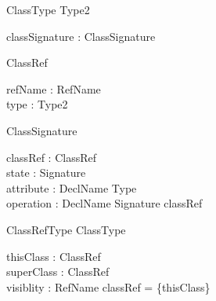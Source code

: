 \begin{sidebyside}
\begin{class}{ClassType}
  Type2\\
\begin{state}
  classSignature : ClassSignature
\end{state}
\end{class}
\nextside
\begin{class}{ClassRef}
\begin{state}
  refName : RefName\\
  type : \seq Type2
\end{state}
\end{class}
\end{sidebyside}
\begin{sidebyside}
\begin{class}{ClassSignature}
\begin{state}
  classRef : \finset ClassRef\\
  state : Signature\\
  attribute : DeclName \pfun Type\\
  operation : DeclName \pfun Signature
\where
  classRef \neq \emptyset
\end{state}
\end{class}
\nextside
\begin{class}{ClassRefType}
  ClassType\\
\begin{state}
  thisClass : ClassRef\\
  superClass : \finset ClassRef\\
  visiblity : \finset RefName
\where
  classRef = \{thisClass\}
\end{state}  
\end{class}
\end{sidebyside}

